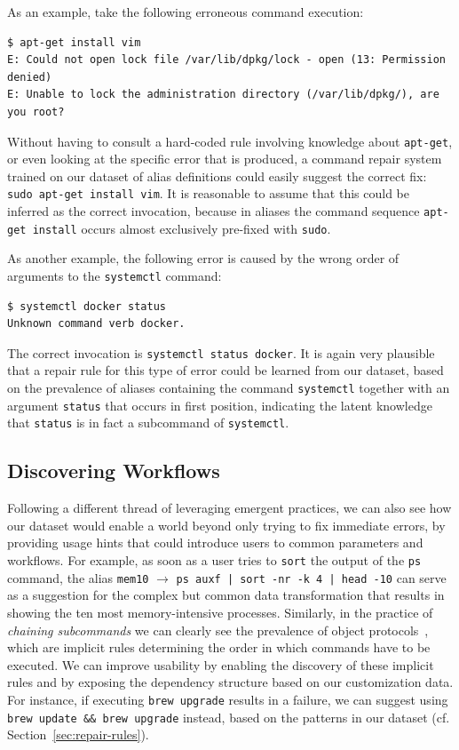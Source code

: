 \documentclass[smallextended,natbib]{svjour3}
\newcommand{\num}[1]{\numprint{#1}}
\newcommand{\alias}[2]{{\texttt{#1} $\rightarrow$ \texttt{#2}}}
\newcommand{\cmd}[1]{{\texttt{#1}}}
\begin{document}
As an example, take the following erroneous command execution:
\begin{Verbatim}[breaklines=true]
$ apt-get install vim
E: Could not open lock file /var/lib/dpkg/lock - open (13: Permission denied)
E: Unable to lock the administration directory (/var/lib/dpkg/), are you root?
\end{Verbatim}
Without having to consult a hard-coded rule involving knowledge about \cmd{apt-get}, or even looking at the specific error that is produced, a command repair system trained on our dataset of alias definitions could easily suggest the correct fix: \texttt{sudo apt-get install vim}.
It is reasonable to assume that this could be inferred as the correct invocation, because in aliases the command sequence \texttt{apt-get install} occurs almost exclusively pre-fixed with \cmd{sudo}.

As another example, the following error is caused by the wrong order of arguments to the \cmd{systemctl} command:
\begin{Verbatim}
$ systemctl docker status
Unknown command verb docker.
\end{Verbatim}
The correct invocation is \texttt{systemctl status docker}.
It is again very plausible that a repair rule for this type of error could be learned from our dataset, based on the prevalence of aliases containing the command \cmd{systemctl} together with an argument \texttt{status} that occurs in first position,
indicating the latent knowledge that \texttt{status} is in fact a subcommand of \cmd{systemctl}.

\subsection{Discovering Workflows}
\label{sec:discovering-workflows}

Following a different thread of leveraging emergent practices, we can also see how our dataset would enable a world beyond only trying to fix immediate errors, by providing usage hints that could introduce users to common parameters and workflows.
For example, as soon as a user tries to \cmd{sort} the output of the \cmd{ps} command, the alias \alias{mem10}{ps auxf | sort -nr -k 4 | head -10} can serve as a suggestion for the complex but common data transformation that results in showing the ten most memory-intensive processes.
Similarly, in the practice of \emph{chaining subcommands} we can clearly see the prevalence of object protocols~\citep{beckman:11}, which are implicit rules determining the order in which commands have to be executed.
We can improve usability by enabling the discovery of these implicit rules and by exposing the dependency structure based on our customization data.
For instance, if executing \verb|brew upgrade| results in a failure, we can suggest using \verb|brew update && brew upgrade| instead, based on the patterns in our dataset (cf. Section~\ref{sec:repair-rules}).
\end{document}
